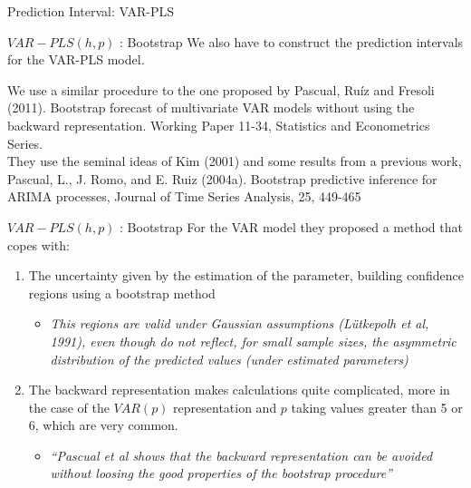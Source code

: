 \documentclass{beamer}
\newcommand{\?}{?`}
\begin{document}
\begin{frame}{}
  \begin{block}{}
    \begin{center}
      \vspace{3mm}
      {\Large Prediction Interval: VAR-PLS}
      \vspace{3mm}
    \end{center}
  \end{block}
\end{frame}

\begin{frame}{$VAR-PLS(h,p)$ : Bootstrap}
\bigskip
  We also have to construct the prediction intervals for the VAR-PLS model.\\

\bigskip

We use a similar procedure to the one proposed by Pascual, Ru\'iz and Fresoli (2011).
Bootstrap forecast of multivariate VAR models without using the backward representation. Working Paper 11-34, Statistics and Econometrics Series. \\

They use the seminal ideas of Kim (2001) and some results from a previous work,
Pascual, L., J. Romo, and E. Ruiz (2004a).
Bootstrap predictive inference for ARIMA processes, Journal of Time Series Analysis, 25, 449-465
\end{frame}


\begin{frame}{$VAR-PLS(h,p)$ : Bootstrap}
For the  VAR model they proposed a method that copes with:
 \medskip
   \begin{enumerate}
  \item The uncertainty given by the estimation of the parameter, building confidence regions using a bootstrap method
  \begin{itemize}
    \item {\it{This regions are valid under Gaussian assumptions (L\"utkepolh et al, 1991), even though do not reflect, for small sample sizes, the asymmetric distribution of the predicted values (under estimated parameters)}}
    \end{itemize}
  \item The backward representation makes calculations quite complicated, more in the case of the $VAR(p)$ representation and $p$ taking values greater than 5 or 6, which are very common.
    \begin{itemize}
    \item {\it{``Pascual et al shows that the backward representation can be avoided without loosing the good properties of the bootstrap procedure''   }}
    \end{itemize}
  \end{enumerate}
\end{frame}
\end{document}
